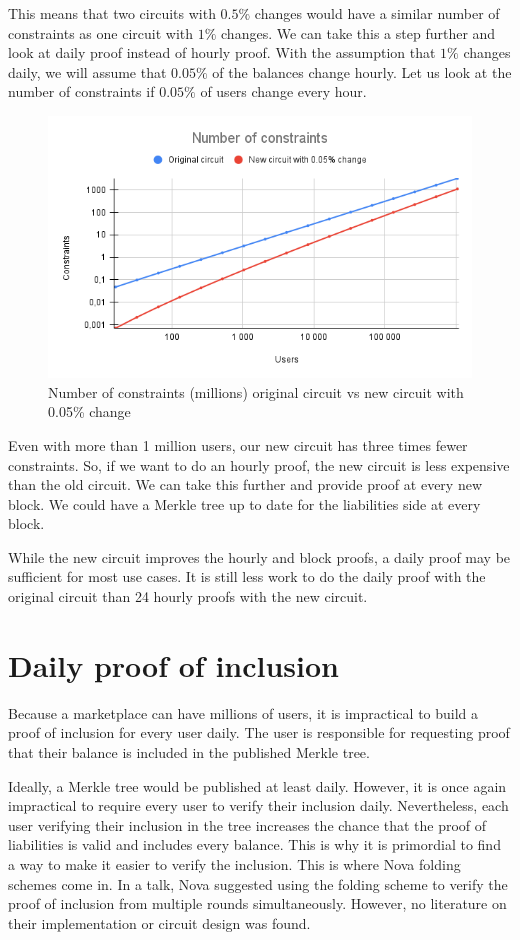 This means that two circuits with $0.5\%$ changes would have a similar number of constraints as one circuit with $1\%$ changes.
We can take this a step further and look at daily proof instead of hourly proof.
With the assumption that $1\%$ changes daily, we will assume that $0.05\%$ of the balances change hourly.
Let us look at the number of constraints if $0.05\%$ of users change every hour.
\begin{figure}[H]
   \centering
   \includegraphics[width=130mm]{Number of constraints .05.png}
   \caption{Number of constraints (millions) original circuit vs new circuit with 0.05\% change}
   \label{overflow}
   \end{figure}
Even with more than 1 million users, our new circuit has three times fewer constraints.
So, if we want to do an hourly proof, the new circuit is less expensive than the old circuit.
We can take this further and provide proof at every new block. We could have a Merkle tree up to date for the liabilities side at every block.

While the new circuit improves the hourly and block proofs, a daily proof may be sufficient for most use cases.
It is still less work to do the daily proof with the original circuit than 24 hourly proofs with the new circuit. 

\section{Daily proof of inclusion}
Because a marketplace can have millions of users, it is impractical to build a proof of inclusion for every user daily.
The user is responsible for requesting proof that their balance is included in the published Merkle tree.

Ideally, a Merkle tree would be published at least daily. However, it is once again impractical to require every user to verify their inclusion daily.
Nevertheless, each user verifying their inclusion in the tree increases the chance that the proof of liabilities is valid and includes every balance.
This is why it is primordial to find a way to make it easier to verify the inclusion. This is where Nova folding schemes come in.
In a talk\cite{NS23}, Nova suggested using the folding scheme to verify the proof of inclusion from multiple rounds simultaneously. 
However, no literature on their implementation or circuit design was found. 

